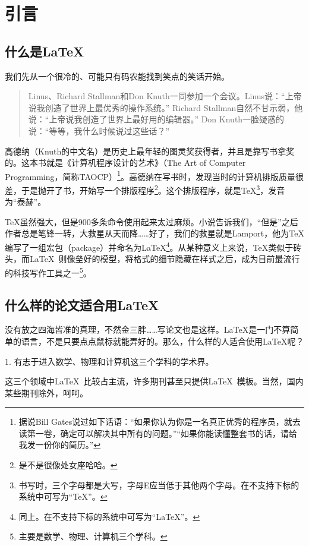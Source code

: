 
\chapter{引言}
\label{chap:introduction}

\section{什么是\LaTeX}

我们先从一个很冷的、可能只有码农能找到笑点的笑话开始。

\begin{quotation}
Linus、Richard Stallman和Don Knuth一同参加一个会议。Linus说：“上帝说我创造了世界上最优秀的操作系统。” Richard Stallman自然不甘示弱，他说：“上帝说我创造了世界上最好用的编辑器。” Don Knuth一脸疑惑的说：“等等，我什么时候说过这些话？”
\end{quotation}

高德纳（Knuth的中文名）是历史上最年轻的图灵奖获得者，并且是靠写书拿奖的。这本书就是《计算机程序设计的艺术》（The Art of Computer Programming，简称TAOCP）\footnote{据说Bill Gates说过如下话语：“如果你认为你是一名真正优秀的程序员，就去读第一卷，确定可以解决其中所有的问题。”“如果你能读懂整套书的话，请给我发一份你的简历。”}。高德纳在写书时，发现当时的计算机排版质量很差，于是抛开了书，开始写一个排版程序\footnote{是不是很像处女座哈哈。}。这个排版程序，就是\TeX\footnote{书写时，三个字母都是大写，字母E应当低于其他两个字母。在不支持下标的系统中可写为“TeX”。}，发音为“泰赫”。

\TeX 虽然强大，但是900多条命令使用起来太过麻烦。小说告诉我们，“但是”之后作者总是笔锋一转，大救星从天而降……好了，我们的救星就是Lamport，他为\TeX 编写了一组宏包（package）并命名为\LaTeX\footnote{同上。在不支持下标的系统中可写为“LaTeX”。}。从某种意义上来说，\TeX 类似于砖头，而\LaTeX~则像垒好的模型，将格式的细节隐藏在样式之后，成为目前最流行的科技写作工具之一\footnote{主要是数学、物理、计算机三个学科。}。

\section{什么样的论文适合用\LaTeX}

没有放之四海皆准的真理，不然金三胖……写论文也是这样。\LaTeX 是一门不算简单的语言，不是只要点点鼠标就能弄好的。那么，什么样的人适合使用\LaTeX 呢？

1. 有志于进入数学、物理和计算机这三个学科的学术界。

这三个领域中\LaTeX~比较占主流，许多期刊甚至只提供\LaTeX~模板。当然，国内某些期刊除外，呵呵。

